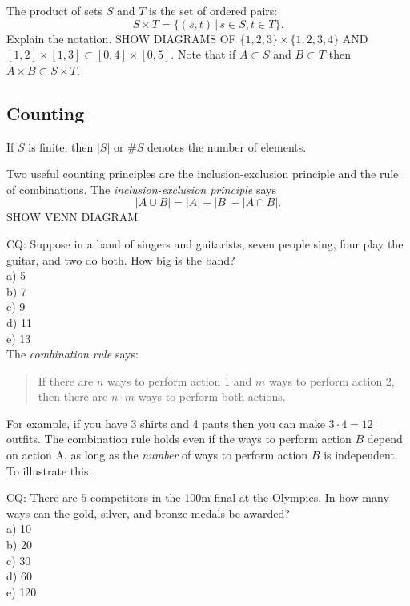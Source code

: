 \documentclass[12pt]{article}
\begin{document}

The product of sets $S$ and $T$ is the set of ordered pairs:
$$S \times T = \{(s,t) \,| \, s\in S, t \in T\}.$$
Explain the notation.  SHOW DIAGRAMS OF $\{1, 2, 3\} \times \{1,2,3,4\}$ AND $[1,2] \times [1,3] \subset [0,4] \times [0,5]$.  Note that if $A \subset S$ and $B \subset T$ then $A \times B \subset S \times T$. \\


\subsection{Counting}
If $S$ is finite, then $|S|$ or $\#S$ denotes the number of elements.

Two useful counting principles are the inclusion-exclusion principle and the rule of combinations.
The {\em inclusion-exclusion principle} says $$|A \cup B| = |A| + |B| - |A \cap B|.$$
SHOW VENN DIAGRAM

CQ: Suppose in a band of singers and guitarists, seven people sing, four play the guitar, and two do both.  How big is the band? \\
a) 5 \\
b) 7 \\
c) 9 \\
d) 11 \\
e) 13 \\

The {\em combination rule} says:
\begin{quotation}
If there are $n$ ways to perform action 1 and $m$ ways to perform action 2, then there are $n \cdot m$ ways to perform both actions.
\end{quotation}
For example, if you have 3 shirts and 4 pants then you can make $3 \cdot 4 = 12$ outfits.  The combination rule holds even if the ways to perform action $B$ depend on action A, as long as the {\em number} of ways to perform action $B$ is independent.  To illustrate this:


CQ: There are $5$ competitors in the 100m final at the Olympics.  In how many ways can the gold, silver, and bronze medals be awarded?\\
a) 10 \\
b) 20 \\
c) 30 \\
d) 60 \\
e) 120 \\
\end{document}
